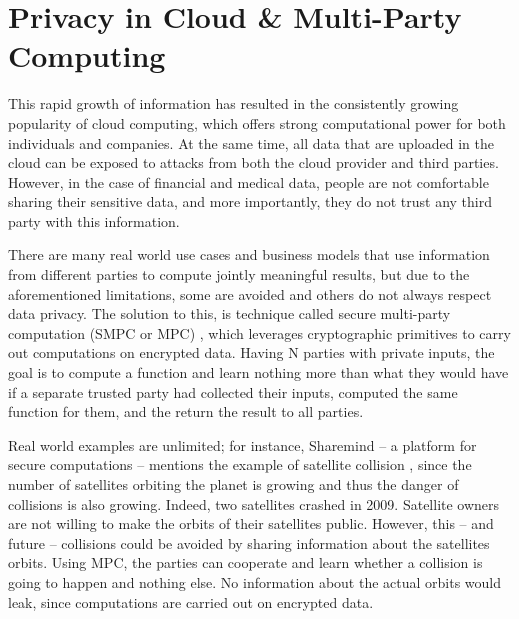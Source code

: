 


\section{Privacy in Cloud \& Multi-Party Computing}\label{s:privacy-cloud-multiparty}

This rapid growth of information has resulted in the consistently growing popularity of cloud computing, which offers strong computational power for both individuals and companies.
At the same time, all data that are uploaded in the cloud can be exposed to attacks from both the cloud provider and third parties.
However, in the case of financial and medical data, people are not comfortable sharing their sensitive data, and more importantly, they do not trust any third party with this information.

There are many real world use cases and business models that use information from different parties to compute jointly meaningful results, but due to the aforementioned limitations, some are avoided and others do not always respect data privacy.
The solution to this, is technique called secure multi-party computation (SMPC or MPC) \cite{yao1982protocols, goldreich1998secure}, which leverages cryptographic primitives to carry out computations on encrypted data.
Having N parties with private inputs, the goal is to compute a function and learn nothing more than what they would have if a separate trusted party had collected their inputs, computed the same function for them, and the return the result to all parties.

Real world examples are unlimited; for instance, Sharemind \cite{bogdanov2008sharemind} -- a platform for secure computations -- mentions the example of satellite collision \cite{kamm2015secure}, since the number of satellites orbiting the planet is growing and thus the danger of collisions is also growing.
Indeed, two satellites crashed in 2009.
Satellite owners are not willing to make the orbits of their satellites public.
However, this -- and future -- collisions could be avoided by sharing information about the satellites orbits.
Using MPC, the parties can cooperate and learn whether a collision is going to happen and nothing else.
No information about the actual orbits would leak, since computations are carried out on encrypted data.


